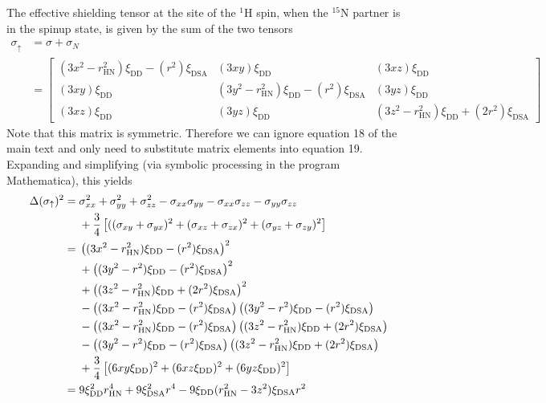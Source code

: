 \documentclass[a4paper,10pt,english,openany,oneside]{sphinxmanual}
\begin{document}
\sphinxAtStartPar
The effective shielding tensor at the site of the $^{\text{1}}$H spin, when the $^{\text{15}}$N partner is in the spin\sphinxhyphen{}up state, is given by the sum of the two tensors
\begin{equation*}
\begin{split}\sigma_\uparrow &= \sigma + \sigma_N\\
&=
\begin{bmatrix}
(3x^2-r_\text{HN}^2)\xi_\text{DD} -(r^2)\xi_\text{DSA}  & (3xy)\xi_\text{DD} & (3xz)\xi_\text{DD}\\
(3xy)\xi_\text{DD} & (3y^2-r_\text{HN}^2)\xi_\text{DD} -(r^2)\xi_\text{DSA} & (3yz)\xi_\text{DD}\\
(3xz)\xi_\text{DD} & (3yz)\xi_\text{DD} & (3z^2 - r_\text{HN}^2)\xi_\text{DD} +(2r^2)\xi_\text{DSA}
\end{bmatrix}\end{split}
\end{equation*}
\sphinxAtStartPar
Note that this matrix is symmetric. Therefore we can ignore equation 18 of the main text and only need to substitute matrix elements into equation 19. Expanding and simplifying (via symbolic processing in the program Mathematica), this yields
\begin{equation*}
\begin{split}\Delta(\sigma_\uparrow)^2={}& \sigma_{xx}^2+\sigma_{yy}^2+\sigma_{zz}^2
-\sigma_{xx}\sigma_{yy}-\sigma_{xx}\sigma_{zz}-\sigma_{yy}\sigma_{zz} \notag\\
&+\frac{3}{4}\left[
((\sigma_{xy}+\sigma_{yx})^2 + (\sigma_{xz}+\sigma_{zx})^2 + (\sigma_{yz}+\sigma_{zy})^2\right]\\
={}&
\left((3x^2-r_\text{HN}^2)\xi_\text{DD} -(r^2)\xi_\text{DSA}\right)^2 \notag\\
&+\left((3y^2-r^2)\xi_\text{DD} -(r^2)\xi_\text{DSA}\right)^2 \notag\\
&+\left((3z^2 - r_\text{HN}^2)\xi_\text{DD} +(2r^2)\xi_\text{DSA}\right)^2 \notag\\
&-\left((3x^2-r_\text{HN}^2)\xi_\text{DD} -(r^2)\xi_\text{DSA}\right)
\left((3y^2-r^2)\xi_\text{DD} -(r^2)\xi_\text{DSA}\right) \notag\\
&-\left((3x^2-r_\text{HN}^2)\xi_\text{DD} -(r^2)\xi_\text{DSA}\right)
\left((3z^2 - r_\text{HN}^2)\xi_\text{DD} +(2r^2)\xi_\text{DSA}\right) \notag\\
&-\left((3y^2-r^2)\xi_\text{DD} -(r^2)\xi_\text{DSA}\right)
\left((3z^2 - r_\text{HN}^2)\xi_\text{DD} +(2r^2)\xi_\text{DSA}\right) \notag\\
&+\frac{3}{4}\left[
(6xy\xi_\text{DD})^2
+ (6xz\xi_\text{DD})^2
+ (6yz\xi_\text{DD})^2
\right]\\
={}& 9\xi_\text{DD}^2r_\text{HN}^4 + 9\xi_\text{DSA}^2r^4 -
9\xi_\text{DD}(r_\text{HN}^2-3z^2)\xi_\text{DSA}r^2\end{split}
\end{equation*}
\end{document}
